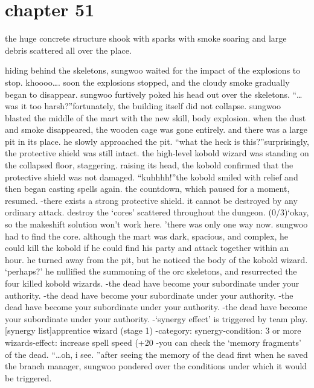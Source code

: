 \section{chapter 51}

                            the huge concrete structure shook with sparks with smoke soaring and large debris scattered all over the place.





hiding behind the skeletons, sungwoo waited for the impact of the explosions to stop.
khoooo….
soon the explosions stopped, and the cloudy smoke gradually began to disappear.
sungwoo furtively poked his head out over the skeletons.
“…was it too harsh?”fortunately, the building itself did not collapse.
sungwoo blasted the middle of the mart with the new skill, body explosion.
 when the dust and smoke disappeared, the wooden cage was gone entirely.
 and there was a large pit in its place.
 he slowly approached the pit.
“what the heck is this?”surprisingly, the protective shield was still intact.
 the high-level kobold wizard was standing on the collapsed floor, staggering.
 raising its head, the kobold confirmed that the protective shield was not damaged.
“kuhhhh!”the kobold smiled with relief and then began casting spells again.
 the countdown, which paused for a moment, resumed.
-there exists a strong protective shield.
it cannot be destroyed by any ordinary attack.
 destroy the ‘cores’ scattered throughout the dungeon.
 (0/3)‘okay, so the makeshift solution won’t work here.
’there was only one way now.
 sungwoo had to find the core.
although the mart was dark, spacious, and complex, he could kill the kobold if he could find his party and attack together within an hour.
he turned away from the pit, but he noticed the body of the kobold wizard.
‘perhaps?’
he nullified the summoning of the orc skeletons, and resurrected the four killed kobold wizards.
-the dead have become your subordinate under your authority.
-the dead have become your subordinate under your authority.
-the dead have become your subordinate under your authority.
-the dead have become your subordinate under your authority.
-‘synergy effect’ is triggered by team play.
[synergy list]apprentice wizard (stage 1) -category: synergy-condition: 3 or more wizards-effect: increase spell speed (+20%
-you can check the ‘memory fragments’ of the dead.
“…oh, i see.
”after seeing the memory of the dead first when he saved the branch manager, sungwoo pondered over the conditions under which it would be triggered.
